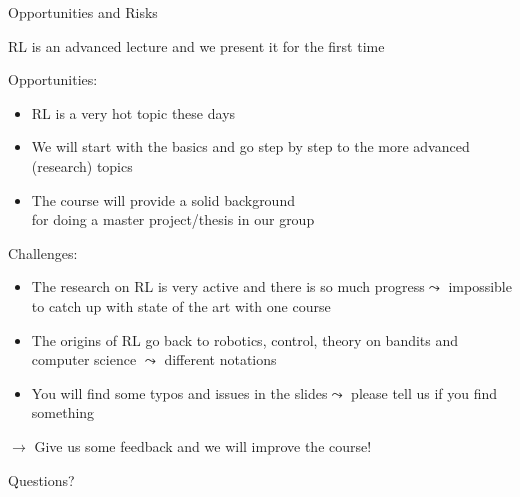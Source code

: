 \begin{frame}[c]{Opportunities and Risks}
	
	RL is an advanced lecture and we present it for the first time
	
	\medskip
	\pause
	
	Opportunities:
	\begin{itemize}
		\item RL is a very hot topic these days
		\item We will start with the basics and go step by step to the more advanced (research) topics
		\item The course will provide a solid background\\ for doing a master project/thesis in our group 
	\end{itemize}
	
	\pause
	
	Challenges:
	\begin{itemize}
		\item The research on RL is very active and there is so much progress\newline $\leadsto$ impossible to catch up with state of the art with one course
		\item The origins of RL go back to robotics, control, theory on bandits and computer science $\leadsto$ different notations
		\item You will find some typos and issues in the slides\newline $\leadsto$ please tell us if you find something
	\end{itemize}
	
	\pause
	$\to$ Give us some feedback and we will improve the course!
	
	
\end{frame}

\begin{frame}[c]{}
	
	\centering
	\huge
	Questions?
	
\end{frame}



